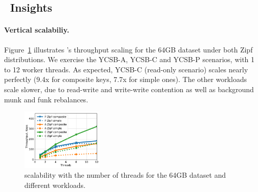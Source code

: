 
\subsection{\sys\ Insights}
\label{ssec:drill} 

\paragraph{Vertical scalabiliy.} 
Figure~\ref{fig:scalability} illustrates \sys's throughput scaling for the 64GB dataset under both Zipf  
distributions. We exercise the YCSB-A, YCSB-C and YCSB-P scenarios, with 1 to 12 worker threads.  
As expected, YCSB-C (read-only scenario) scales nearly perfectly (9.4x for composite keys, 7.7x for simple ones). 
The other workloads scale slower, due to read-write and write-write contention as well as background munk and funk rebalances. 

\begin{figure}[th]
\centering
\includegraphics[width=0.35\textwidth]{figs/scalability_line.pdf}
\caption{{\sys\/ scalability with the number of threads for 
the 64GB dataset and different workloads. }}
\label{fig:scalability}
\end{figure}

